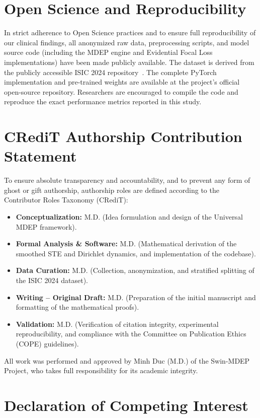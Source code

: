 \documentclass[letterpaper]{article} %
\begin{document}
\section{Open Science and Reproducibility}\label{sec:open_science}

In strict adherence to Open Science practices and to ensure full reproducibility of our clinical findings, all anonymized raw data, preprocessing scripts, and model source code (including the MDEP engine and Evidential Focal Loss implementations) have been made publicly available. The dataset is derived from the publicly accessible ISIC 2024 repository~\cite{isic2024}. The complete PyTorch implementation and pre-trained weights are available at the project's official open-source repository. Researchers are encouraged to compile the code and reproduce the exact performance metrics reported in this study.

\section{CRediT Authorship Contribution Statement}\label{sec:credit}

To ensure absolute transparency and accountability, and to prevent any form of ghost or gift authorship, authorship roles are defined according to the Contributor Roles Taxonomy (CRediT):
\begin{itemize}
    \item \textbf{Conceptualization:} M.D. (Idea formulation and design of the Universal MDEP framework).
    \item \textbf{Formal Analysis \& Software:} M.D. (Mathematical derivation of the smoothed STE and Dirichlet dynamics, and implementation of the codebase).
    \item \textbf{Data Curation:} M.D. (Collection, anonymization, and stratified splitting of the ISIC 2024 dataset).
    \item \textbf{Writing -- Original Draft:} M.D. (Preparation of the initial manuscript and formatting of the mathematical proofs).
    \item \textbf{Validation:} M.D. (Verification of citation integrity, experimental reproducibility, and compliance with the Committee on Publication Ethics (COPE) guidelines).
\end{itemize}
All work was performed and approved by Minh Duc (M.D.) of the Swin-MDEP Project, who takes full responsibility for its academic integrity.

\section{Declaration of Competing Interest}\label{sec:coi}
\end{document}
